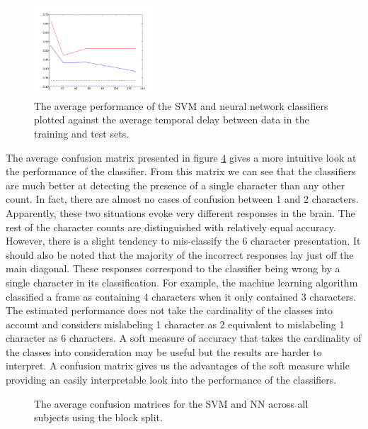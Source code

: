 \documentclass[preprint,5p,authoryear]{elsarticle}
\begin{document}
\begin{figure}
\centering
\includegraphics[width=0.4\textwidth]{figures/performance-verse-temporal-distance}
\caption{The average performance of the SVM and neural network classifiers plotted against the average temporal delay between data in the training and test sets.}
\label{fig:performance-verse-temporal-distance}
\end{figure}

The average confusion matrix presented in figure \ref{fig:average-confusion} gives a more intuitive look at the performance of the classifier.
From this matrix we can see that the classifiers are much better at detecting the presence of a single character than any other count.
In fact, there are almost no cases of confusion between 1 and 2 characters.
Apparently, these two situations evoke very different responses in the brain.
The rest of the character counts are distinguished with relatively equal accuracy.
However, there is a slight tendency to mis-classify the 6 character presentation.
It should also be noted that the majority of the incorrect responses lay just off the main diagonal.
These responses correspond to the classifier being wrong by a single character in its classification.
For example, the machine learning algorithm classified a frame as containing 4 characters when it only contained 3 characters.
The estimated performance does not take the cardinality of the classes into account and considers mislabeling 1 character as 2 equivalent to mislabeling 1 character as 6 characters.
A soft measure of accuracy that takes the cardinality of the classes into consideration may be useful but the results are harder to interpret.
A confusion matrix gives us the advantages of the soft measure while providing an easily interpretable look into the performance of the classifiers.

\begin{figure}
\centering
\begin{subfigure}{0.4\textwidth}
\centering

\caption{}
\label{fig:average-confusion-svm}
\end{subfigure}
\begin{subfigure}{0.4\textwidth}
\centering

\caption{}
\label{fig:average-confusion-nn}
\end{subfigure}
\caption{The average confusion matrices for the  SVM and  NN across all subjects using the block split.}
\label{fig:average-confusion}
\end{figure}
\end{document}

